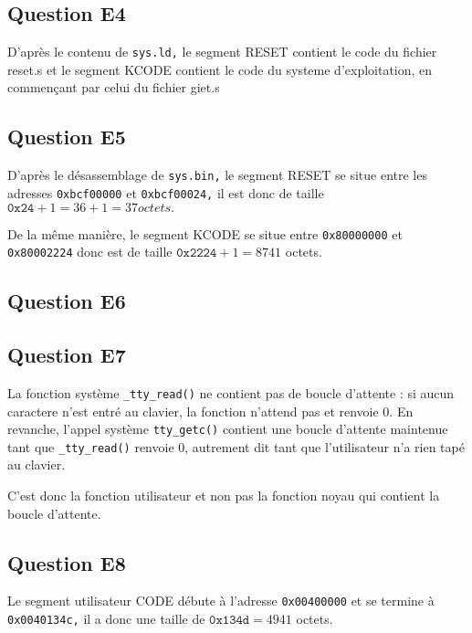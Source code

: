 \documentclass{article}
\begin{document}
\subsection{Question E4}

D'après le contenu de \texttt{sys.ld,} le segment RESET contient le code du fichier
reset.s et le segment KCODE contient le code du systeme d'exploitation,
en commençant par celui du fichier giet.s

\subsection{Question E5}

D'après le désassemblage de \texttt{sys.bin,} le segment RESET se situe entre les
adresses \texttt{0xbcf00000} et \texttt{0xbcf00024,} il est donc de taille
$ \texttt{0x24} + 1 = 36 + 1 = 37 octets. $

De la même manière, le segment KCODE se situe entre \texttt{0x80000000}
et \texttt{0x80002224} donc est de taille $\texttt{0x2224} + 1 = 8741$ octets.

\subsection{Question E6}



\subsection{Question E7}

La fonction système \texttt{\_tty\_read()} ne contient pas de boucle d'attente :
si aucun caractere n'est entré au clavier, la fonction n'attend pas et
renvoie 0.
En revanche, l'appel système \texttt{tty\_getc()} contient une boucle d'attente
maintenue tant que \texttt{\_tty\_read()} renvoie 0, autrement dit tant que
l'utilisateur n'a rien tapé au clavier.

C'est donc la fonction utilisateur et non pas la fonction noyau qui contient
la boucle d'attente.

\subsection{Question E8}

Le segment utilisateur CODE débute à l'adresse \texttt{0x00400000} et se termine à
\texttt{0x0040134c,} il a donc une taille de $\texttt{0x134d} = 4941$ octets.
\end{document}
